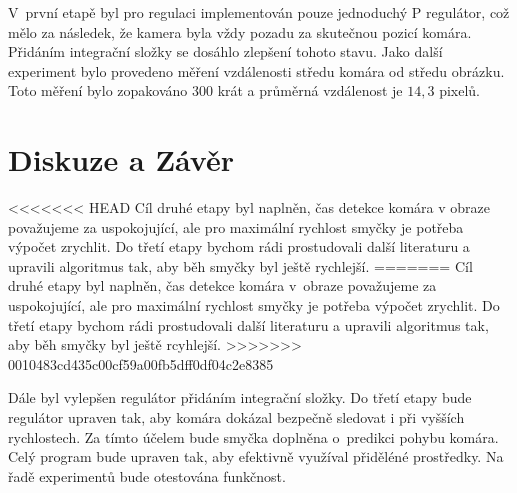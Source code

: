 \documentclass[a4paper,10pt]{article}
\begin{document}
		V~první etapě byl pro regulaci implementován pouze jednoduchý P regulátor, což mělo za následek, 
		že kamera byla vždy pozadu za skutečnou pozicí komára. Přidáním integrační složky se dosáhlo zlepšení tohoto stavu. 
		Jako další experiment bylo provedeno měření vzdálenosti středu komára od středu obrázku. 
		Toto měření bylo zopakováno 300 krát a průměrná vzdálenost je $14,3 $ pixelů.



\section{Diskuze a Závěr}
<<<<<<< HEAD
		Cíl druhé etapy byl naplněn, čas detekce komára v obraze považujeme za uspokojující, ale pro maximální rychlost smyčky je potřeba výpočet zrychlit. Do třetí etapy bychom rádi prostudovali další literaturu a upravili algoritmus tak, aby běh smyčky byl ještě rychlejší. 
=======
		Cíl druhé etapy byl naplněn, čas detekce komára v~obraze považujeme za uspokojující, ale pro maximální rychlost smyčky je potřeba výpočet zrychlit. Do třetí etapy bychom rádi prostudovali další literaturu a upravili algoritmus tak, aby běh smyčky byl ještě rcyhlejší. 
>>>>>>> 0010483cd435c00cf59a00fb5dff0df04c2e8385

		Dále byl vylepšen regulátor přidáním integrační složky. Do třetí etapy bude regulátor upraven tak, 
		aby komára dokázal bezpečně sledovat i při vyšších rychlostech.
		Za tímto účelem bude smyčka doplněna o~predikci pohybu komára. Celý program bude upraven tak, aby efektivně využíval přiděléné prostředky.
		Na řadě experimentů bude otestována funkčnost. 



\end{document}
